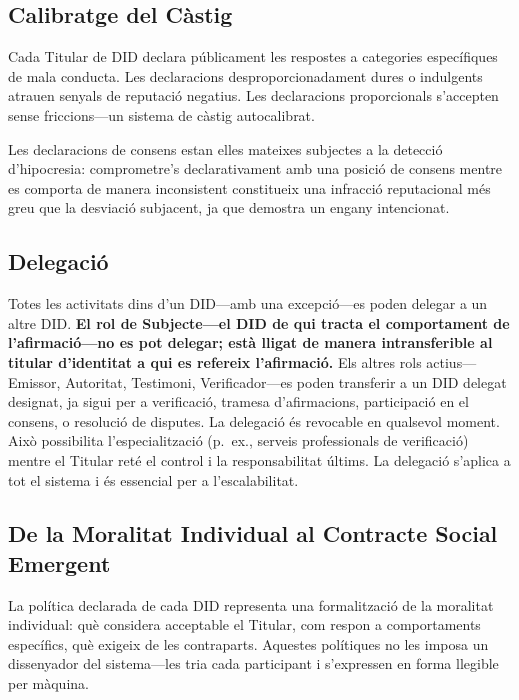 \documentclass[11pt,a4paper,twocolumn]{article}
\begin{document}
\subsection{Calibratge del Càstig}

Cada Titular de DID declara públicament les respostes a categories específiques de mala conducta. Les declaracions desproporcionadament dures o indulgents atrauen senyals de reputació negatius. Les declaracions proporcionals s'accepten sense friccions---un sistema de càstig autocalibrat.

Les declaracions de consens estan elles mateixes subjectes a la detecció d'hipocresia: comprometre's declarativament amb una posició de consens mentre es comporta de manera inconsistent constitueix una infracció reputacional més greu que la desviació subjacent, ja que demostra un engany intencionat.

\subsection{Delegació}

Totes les activitats dins d'un DID---amb una excepció---es poden delegar a un altre DID. \textbf{El rol de Subjecte---el DID de qui tracta el comportament de l'afirmació---no es pot delegar; està lligat de manera intransferible al titular d'identitat a qui es refereix l'afirmació.} Els altres rols actius---Emissor, Autoritat, Testimoni, Verificador---es poden transferir a un DID delegat designat, ja sigui per a verificació, tramesa d'afirmacions, participació en el consens, o resolució de disputes. La delegació és revocable en qualsevol moment. Això possibilita l'especialització (p.\ ex., serveis professionals de verificació) mentre el Titular reté el control i la responsabilitat últims. La delegació s'aplica a tot el sistema i és essencial per a l'escalabilitat.

\subsection{De la Moralitat Individual al Contracte Social Emergent}

La política declarada de cada DID representa una formalització de la moralitat individual: què considera acceptable el Titular, com respon a comportaments específics, què exigeix de les contraparts. Aquestes polítiques no les imposa un dissenyador del sistema---les tria cada participant i s'expressen en forma llegible per màquina.
\end{document}
